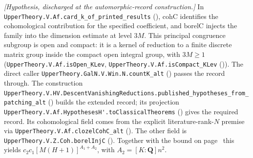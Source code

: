 \emph{[Hypothesis, discharged at the automorphic-record construction.]} In \nolinkurl{UpperTheory.V.Af.card_k_of_printed_results} (), $\mathrm{cohC}$ identifies the cohomological contribution for the specified coefficient, and $\mathrm{borelC}$ injects the family into the dimension estimate at level $3M$. This principal congruence subgroup is open and compact: it is a kernel of reduction to a finite discrete matrix group inside the compact open integral group, with $3M\ge1$ (\nolinkurl{UpperTheory.V.Af.isOpen_KLev}, \nolinkurl{UpperTheory.V.Af.isCompact_KLev} ()). The direct caller \nolinkurl{UpperTheory.GalN.V.Win.N.countK_alt} () passes the record through. The construction \nolinkurl{UpperTheory.V.HV.DescentVanishingReductions.published_hypotheses_from_patching_alt} () builds the extended record; its projection \nolinkurl{UpperTheory.V.Af.HypothesesH'.toClassicalTheorems} () gives the required record. Its cohomological field comes from the explicit literature-rank-$N$ premise via \nolinkurl{UpperTheory.V.Af.clozelCohC_alt} (). The other field is \nolinkurl{UpperTheory.V.Z.Coh.borelInjC} (). Together with the bound on page~\pageref{r6:Z1.5.02} this yields $c_2c_1[M(H+1)]^{A_1+A_2}$, with $A_2=[K:\mathbf Q]n^2$.

